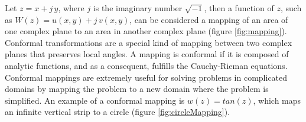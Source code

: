   \par Let $z = x + j\,y$, where $j$ is the imaginary number $\sqrt{-1}$, then a function of $z$, such as $W(z) = u(x,y) + j\,v(x,y)$, can be considered a mapping of an area of one complex plane to an area in another complex plane (figure \ref{fig:mapping}). Conformal transformations are a special kind of mapping between two complex planes that preserves local angles. A mapping is conformal if it is composed of analytic functions, and as a consequent, fulfills the Cauchy-Rieman equations. Conformal mappings are extremely useful for solving problems in complicated domains by mapping the problem to a new domain where the problem is simplified. An example of a conformal mapping is $w(z) = tan(z)$, which maps an infinite vertical strip to a circle (figure \ref{fig:circleMapping}). 

